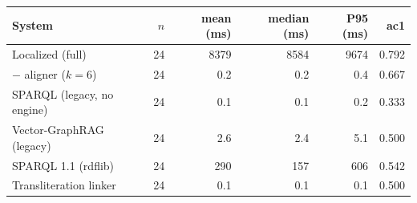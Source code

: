 {\setlength{\tabcolsep}{3pt}\scriptsize%
\begin{tabular}{lrrrrr}
\toprule
System & $n$ & mean (ms) & median (ms) & P95 (ms) & ac1 \\
\midrule
Localized (full) & 24 & 8379 & 8584 & 9674 & 0.792 \\
\quad $-$ aligner ($k{=}6$) & 24 & 0.2 & 0.2 & 0.4 & 0.667 \\
SPARQL (legacy, no engine) & 24 & 0.1 & 0.1 & 0.2 & 0.333 \\
Vector-GraphRAG (legacy) & 24 & 2.6 & 2.4 & 5.1 & 0.500 \\
SPARQL 1.1 (rdflib) & 24 & 290 & 157 & 606 & 0.542 \\
Transliteration linker & 24 & 0.1 & 0.1 & 0.1 & 0.500 \\
\bottomrule
\end{tabular}}
